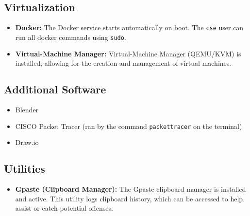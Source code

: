 \documentclass[12pt]{article}
\begin{document}
\subsection{Virtualization}
\begin{itemize}
    \item \textbf{Docker:} The Docker service starts automatically on boot. The \texttt{cse} user can run all docker commands using \texttt{sudo}.
    \item \textbf{Virtual-Machine Manager:} Virtual-Machine Manager (QEMU/KVM) is installed, allowing for the creation and management of virtual machines.
\end{itemize}

\subsection{Additional Software}
\begin{itemize}
    \item Blender
    \item CISCO Packet Tracer (ran by the command \texttt{packettracer} on the terminal)
    \item Draw.io
\end{itemize}

\subsection{Utilities}
\begin{itemize}
    \item \textbf{Gpaste (Clipboard Manager):} The Gpaste clipboard manager is installed and active. This utility logs clipboard history, which can be accessed to help assist or catch potential offenses.
\end{itemize}
\end{document}
